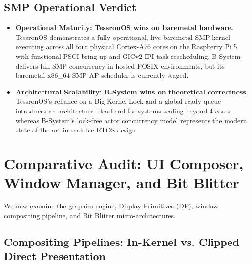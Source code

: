 \documentclass[10pt,journal,compsoc,twocolumn]{article}
\begin{document}
\subsection{SMP Operational Verdict}
\begin{itemize}[leftmargin=*]
    \item \textbf{Operational Maturity:} \textbf{TessronOS wins on baremetal hardware.} TessronOS demonstrates a fully operational, live baremetal SMP kernel executing across all four physical Cortex-A76 cores on the Raspberry Pi 5 with functional PSCI bring-up and GICv2 IPI task rescheduling. B-System delivers full SMP concurrency in hosted POSIX environments, but its baremetal x86\_64 SMP AP scheduler is currently staged.
    \item \textbf{Architectural Scalability:} \textbf{B-System wins on theoretical correctness.} TessronOS's reliance on a Big Kernel Lock and a global ready queue introduces an architectural dead-end for systems scaling beyond 4 cores, whereas B-System's lock-free actor concurrency model represents the modern state-of-the-art in scalable RTOS design.
\end{itemize}

\section{Comparative Audit: UI Composer, Window Manager, and Bit Blitter}
\label{sec:blitter}

We now examine the graphics engine, Display Primitives (DP), window compositing pipeline, and Bit Blitter micro-architectures.

\subsection{Compositing Pipelines: In-Kernel vs. Clipped Direct Presentation}
\end{document}
